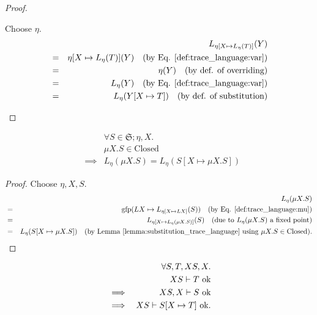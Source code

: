 \documentclass{llncs}
\renewcommand*{\S}{\mathfrak{S}}
\newcommand*{\gfp}{\mathrm{gfp}}
\newcommand*{\Closed}{\mathrm{Closed}}
\newcommand*{\ok}[1]{\text{$#1$ {\normalfont \rmfamily ok}}}
\newcommand*{\envimpl}       [2]{#1 \vdash #2}
\newcommand*{\envimplok}     [2]{\envimpl{#1}{\ok{#2}}}
\renewcommand*{\|}{\;|\;}
\begin{document}
\begin{proof}
\begin{enumerate}
      Choose $\eta$.
      \begin{eqnarray*}
        &&  L_{\eta[X \mapsto L_\eta(T)]}(Y) \\
        &=& \eta[X \mapsto L_\eta(T)](Y)
            \quad \text{(by Eq. \ref{def:trace_language:var})} \\
        &=& \eta(Y)
            \quad \text{(by def. of overriding)} \\
        &=& L_\eta(Y)
            \quad \text{(by Eq. \ref{def:trace_language:var})} \\
        &=& L_\eta(Y[X \mapsto T])
            \quad \text{(by def. of substitution)}
      \end{eqnarray*}

  \end{enumerate}
\end{proof}


\begin{lemma}
  \label{lemma:mu_expansion_trace_language}
  \begin{eqnarray*}
    &&         \forall S \in \S; \eta, X. \\
    &&         \mu X.S \in \Closed \\ %
    &\implies& L_\eta(\mu X.S) = L_\eta(S[X \mapsto \mu X.S])
  \end{eqnarray*}
\end{lemma}

\begin{proof}
  Choose $\eta, X, S$.
  \begin{eqnarray*}
    &&  L_\eta(\mu X.S) \\
    &=& \gfp(LX \mapsto L_{\eta[X \mapsto LX]}(S))
        \quad \text{(by Eq. \ref{def:trace_language:mu})} \\
    &=& L_{\eta[X \mapsto L_\eta(\mu X.S)]}(S)
        \quad \text{(due to $L_\eta(\mu X.S)$ a fixed point)} \\
    &=& L_\eta(S[X \mapsto \mu X.S])
        \quad \text{(by Lemma \ref{lemma:substitution_trace_language} using $\mu X.S \in \Closed$)}.
  \end{eqnarray*}
\end{proof}


\begin{lemma}
  \label{lemma:substitution_wellformedness}
  \begin{eqnarray*}
    &&         \forall S, T, XS, X. \\
    &&         \envimplok{XS}{T} \\
    &\implies& \envimplok{XS, X}{S} \\
    &\implies& \envimplok{XS}{S[X \mapsto T]}.
  \end{eqnarray*}
\end{lemma}
\end{document}
